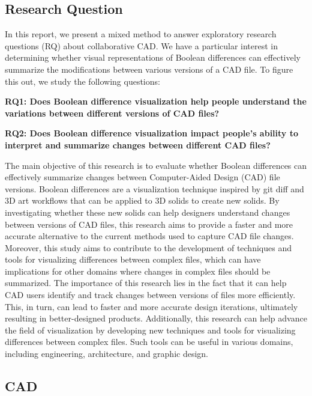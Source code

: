 \documentclass[sigconf,authorversion,nonacm]{acmart}
\begin{document}
\subsection{Research Question}
In this report, we present a mixed method to answer exploratory research questions (RQ) about collaborative CAD.
We have a particular interest in determining whether visual representations of Boolean differences can effectively summarize the modifications between various versions of a CAD file.
To figure this out, we study the following questions:

\textbf{RQ1: Does Boolean difference visualization help people understand the variations between different versions of CAD files?}

\textbf{RQ2: Does Boolean difference visualization impact people's ability to interpret and summarize changes between different CAD files?}

The main objective of this research is to evaluate whether Boolean differences can effectively summarize changes between Computer-Aided Design (CAD) file versions.
Boolean differences are a visualization technique inspired by git diff and 3D art workflows that can be applied to 3D solids to create new solids.
By investigating whether these new solids can help designers understand changes between versions of CAD files, this research aims to provide a faster and more accurate alternative to the current methods used to capture CAD file changes.
Moreover, this study aims to contribute to the development of techniques and tools for visualizing differences between complex files, which can have implications for other domains where changes in complex files should be summarized.
The importance of this research lies in the fact that it can help CAD users identify and track changes between versions of files more efficiently.
This, in turn, can lead to faster and more accurate design iterations, ultimately resulting in better-designed products.
Additionally, this research can help advance the field of visualization by developing new techniques and tools for visualizing differences between complex files.
Such tools can be useful in various domains, including engineering, architecture, and graphic design.
\subsection{CAD}
\end{document}
